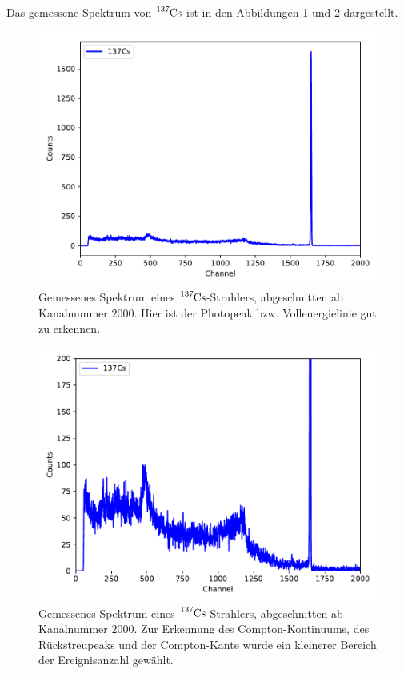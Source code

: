 Das gemessene Spektrum von $\ce{^{137}Cs}$ ist in den Abbildungen \ref{fig:plot2} und \ref{fig:plot21} dargestellt.

\begin{figure}
  \centering
  \includegraphics[scale=0.7]{content/plot2.pdf}
  \caption{Gemessenes Spektrum eines $\ce{^{137}Cs}$-Strahlers, abgeschnitten ab Kanalnummer $\num{2000}$. Hier ist der
  Photopeak bzw. Vollenergielinie gut zu erkennen.}
  \label{fig:plot2}
\end{figure}

\begin{figure}
  \centering
  \includegraphics[scale=0.7]{content/plot21.pdf}
  \caption{Gemessenes Spektrum eines $\ce{^{137}Cs}$-Strahlers, abgeschnitten ab Kanalnummer $\num{2000}$. Zur Erkennung
    des Compton-Kontinuums, des Rückstreupeaks und der Compton-Kante wurde ein kleinerer Bereich der Ereignisanzahl gewählt.}
  \label{fig:plot21}
\end{figure}

